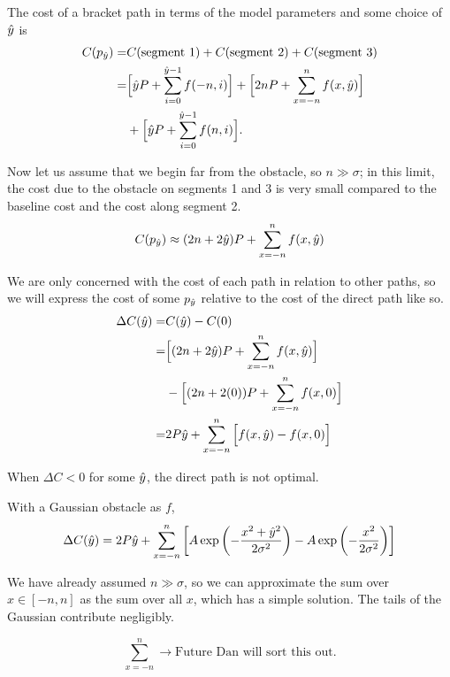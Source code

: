 The cost of a bracket path in terms of the model parameters and some choice of $\hat{y}$ is 
\begin{align*}
C(p_{\hat{y}}) =& C(\text{segment 1}) + C(\text{segment 2}) + C(\text{segment 3}) \\
=&\Big[\hat{y} P + \sum\limits_{i=0}^{\hat{y}-1} f(-n, i) \Big] +
         \Big[2nP + \sum\limits_{x=-n}^{n}    f(x,\hat{y}) \Big]\\
     &+\Big[\hat{y} P + \sum\limits_{i=0}^{\hat{y}-1} f(n, i) \Big].
\end{align*}

Now let us assume that we begin far from the obstacle, so $n \gg \sigma$; in this limit, the cost due to the obstacle on segments 1 and 3 is very small compared to the baseline cost and the cost along segment 2.
\begin{equation}
C(p_{\hat{y}}) \approx (2n+2\hat{y})P +  \sum\limits_{x=-n}^{n} f(x,\hat{y})
\end{equation}

We are only concerned with the cost of each path in relation to other paths, so we will express the cost of some $p_{\hat{y}}$ relative to the cost of the direct path like so. 
\begin{align*}
\Delta C(\hat{y}) =& C(\hat{y})-C(0) \\
=& \Big[(2n+2\hat{y})P +  \sum\limits_{x=-n}^{n} f(x,\hat{y}) \Big] \\
 & - \Big[(2n+2(0))P +  \sum\limits_{x=-n}^{n} f(x,0) \Big] \\
=& 2P\hat{y} + \sum\limits_{x=-n}^{n} \Big[ f(x,\hat{y})-f(x,0) \Big]
\end{align*}

When $\Delta C < 0$ for some $\hat{y}$, the direct path is not optimal.

With a Gaussian obstacle as $f$,
\begin{equation}
\Delta C(\hat{y}) = 2P\hat{y} + \sum\limits_{x=-n}^{n} \left[A\exp\left(-\frac{x^2 + \hat{y}^2}{2\sigma^2}\right) - A\exp\left(-\frac{x^2}{2\sigma^2}\right) \right]
\end{equation}

We have already assumed $n \gg \sigma$, so we can approximate the sum over $x \in [-n, n]$ as the sum over all $x$, which has a simple solution. The tails of the Gaussian contribute negligibly.

\begin{equation}
\sum\limits_{x=-n}^{n} \rightarrow \text{Future Dan will sort this out.}
\end{equation}


